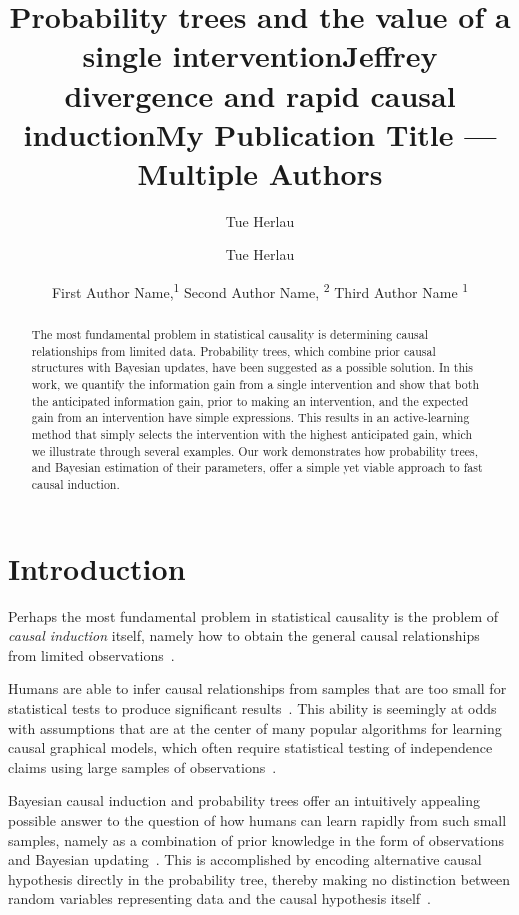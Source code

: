\documentclass[letterpaper]{article} %
\title{Probability trees and the value of a single intervention}
\author {
	Tue Herlau%
}
\title{Jeffrey divergence and rapid causal induction}
\author {
Tue Herlau
}
\title{My Publication Title --- Multiple Authors}
\author {
    First Author Name,\textsuperscript{\rm 1}
    Second Author Name, \textsuperscript{\rm 2}
    Third Author Name \textsuperscript{\rm 1}
}
\begin{document}
\maketitle



\begin{abstract}
The most fundamental problem in statistical causality is determining causal relationships from limited data. Probability trees, which combine prior causal structures with Bayesian updates, 
have been suggested as a possible solution.	
In this work, we quantify the information gain from a single intervention and show that both the anticipated information gain, prior to making an intervention, and the expected gain from an intervention have simple expressions. This results in an active-learning method that simply selects the intervention with the highest anticipated gain, which we illustrate through several examples. Our work demonstrates how probability trees, and Bayesian estimation of their parameters, offer a simple yet viable approach to fast causal induction.
\end{abstract}

\noindent 
\section{Introduction}

Perhaps the most fundamental problem in statistical causality is the problem of \emph{causal induction} itself, namely how to obtain the general causal relationships from limited observations~\citep{griffiths2007mere}. 


Humans are able to infer causal relationships from samples that are too small for statistical tests to produce significant results~\cite{gopnik2001causal}. This ability is seemingly at odds with assumptions that are at the center of many popular algorithms for learning causal graphical models, which often require statistical testing of independence claims using large samples of observations~\cite{spirtes2000causation,pearl2000models,janzing2012information}. %








Bayesian causal induction and probability trees offer an intuitively appealing possible answer to the question of how humans can learn rapidly from such small samples, namely as a combination of prior knowledge in the form of observations and Bayesian updating~\cite{griffiths2009theory,ortega2015subjectivity}. This is accomplished by encoding alternative causal hypothesis directly in the probability tree, thereby making no distinction between random variables representing data and the causal hypothesis itself~\cite{genewein2020algorithms,shafer1996art}. %
\end{document}
